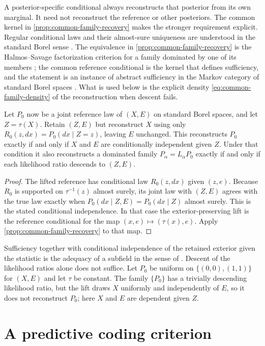 A posterior-specific conditional always reconstructs that posterior from
its own marginal. It need not reconstruct the reference or other
posteriors. The common kernel in \cref{prop:common-family-recovery}
makes the stronger requirement explicit. Regular conditional laws and
their almost-sure uniqueness are understood in the standard Borel
sense \citep{Kallenberg2021}. The equivalence in \cref{prop:common-family-recovery} is the Halmos--Savage factorization criterion for a family dominated by one of its members \citep{HalmosSavage1949}; the common reference conditional is the kernel that defines sufficiency, and the statement is an instance of abstract sufficiency in the Markov category of standard Borel spaces \citep{Fritz2020}. What is used below is the explicit density \cref{eq:common-family-density} of the reconstruction when descent fails.

Let $P_0$ now be a joint reference law of $(X,E)$ on standard Borel spaces,
and let $Z=\tau(X)$. Retain $(Z,E)$ but reconstruct $X$ using only
$R_0(z,dx)=P_0(dx\mid Z=z)$, leaving $E$ unchanged. This reconstructs
$P_0$ exactly if and only if $X$ and $E$ are conditionally independent
given $Z$. Under that condition it also reconstructs a dominated family
$P_\alpha=L_\alpha P_0$ exactly if and only if each likelihood ratio
descends to $(Z,E)$.
\begin{proof}
The lifted reference has conditional law $R_0(z,dx)$ given $(z,e)$.
Because $R_0$ is supported on $\tau^{-1}(z)$ almost surely, its joint law
with $(Z,E)$ agrees with the true law exactly when
$P_0(dx\mid Z,E)=P_0(dx\mid Z)$ almost surely. This is the stated
conditional independence. In that case the exterior-preserving lift is
the reference conditional for the map $(x,e)\mapsto(\tau(x),e)$.
Apply \cref{prop:common-family-recovery} to that map.
\end{proof}

Sufficiency together with conditional independence of the retained exterior given the statistic is the adequacy of a subfield in the sense of \citet{Skibinsky1967}. Descent of the likelihood ratios alone does not suffice. Let $P_0$ be uniform on $\{(0,0),(1,1)\}$ for $(X,E)$ and let $\tau$ be constant. The family $\{P_0\}$ has a trivially descending likelihood ratio, but the lift draws $X$ uniformly and independently of $E$, so it does not reconstruct $P_0$; here $X$ and $E$ are dependent given $Z$.

\section{A predictive coding criterion}

